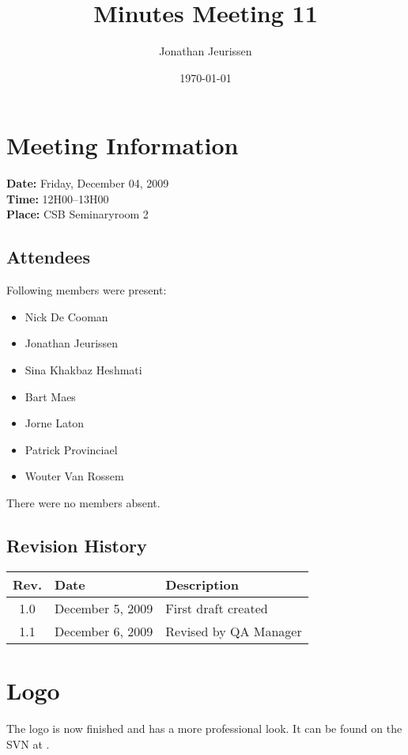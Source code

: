 \documentclass[a4paper, 12pt]{article}
\begin{document}
\title{Minutes Meeting 11}
\author{Jonathan Jeurissen}
\date{\today}

\maketitle	
	\section{Meeting Information}
		\textbf{Date:} Friday, December 04, 2009\\
		\textbf{Time:} 12H00--13H00\\
		\textbf{Place:} CSB Seminaryroom 2\\
		\subsection{Attendees}
Following members were present:
			\begin{itemize}
				\item Nick De Cooman
				\item Jonathan Jeurissen
				\item Sina Khakbaz Heshmati
				\item Bart Maes
				\item Jorne Laton
				\item Patrick Provinciael
				\item Wouter Van Rossem
			\end{itemize}
There were no members absent.
			
		\subsection{Revision History}
			\begin{tabular}{c | l | l }
				\textbf{Rev.} & \textbf{Date} & \textbf{Description} \\
				\hline
				1.0 & December 5, 2009 & First draft created \\
				1.1 & December 6, 2009 & Revised by QA Manager \\

			\end{tabular}		

	\section{Logo}
The logo is now finished and has a more professional look. It can be found on the SVN at \cite{site1}.
\end{document}
